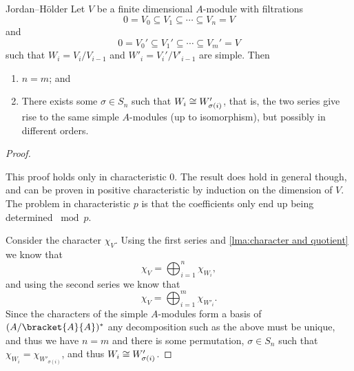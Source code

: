 \begin{thm}{Jordan--H\"older}{}
    Let \(V\) be a finite dimensional \(A\)-module with filtrations
    \begin{equation}
        0 = V_0 \subseteq V_1 \subseteq \dotsb \subseteq V_n = V
    \end{equation}
    and
    \begin{equation}
        0 = V_0' \subseteq V_1' \subseteq \dotsb \subseteq V_m' = V
    \end{equation}
    such that \(W_i = V_i/V_{i-1}\) and \(W'_{i} = V_i'/V'_{i-1}\) are simple.
    Then
    \begin{enumerate}
        \item \(n = m\); and
        \item There exists some \(\sigma \in S_n\) such that \(W_i \cong W'_{\sigma(i)}\), that is, the two series give rise to the same simple \(A\)-modules (up to isomorphism), but possibly in different orders.
    \end{enumerate}
    \begin{proof}
        ~
        \begin{wrn}
            This proof holds only in characteristic 0.
            The result does hold in general though, and can be proven in positive characteristic by induction on the dimension of \(V\).
            The problem in characteristic \(p\) is that the coefficients only end up being determined \(\bmod p\).
        \end{wrn}
        
        Consider the character \(\chi_V\).
        Using the first series and \cref{lma:character and quotient} we know that
        \begin{equation}
            \chi_V = \bigoplus_{i=1}^n \chi_{W_i},
        \end{equation}
        and using the second series we know that
        \begin{equation}
            \chi_V = \bigoplus_{i=1}^m \chi_{W'_i}.
        \end{equation}
        Since the characters of the simple \(A\)-modules form a basis of \((A/\bracket{A}{A})^*\) any decomposition such as the above must be unique, and thus we have \(n = m\) and there is some permutation, \(\sigma \in S_n\) such that \(\chi_{W_i} = \chi_{W'_{\sigma(i)}}\), and thus \(W_i \cong W'_{\sigma(i)}\).
    \end{proof}
\end{thm}

